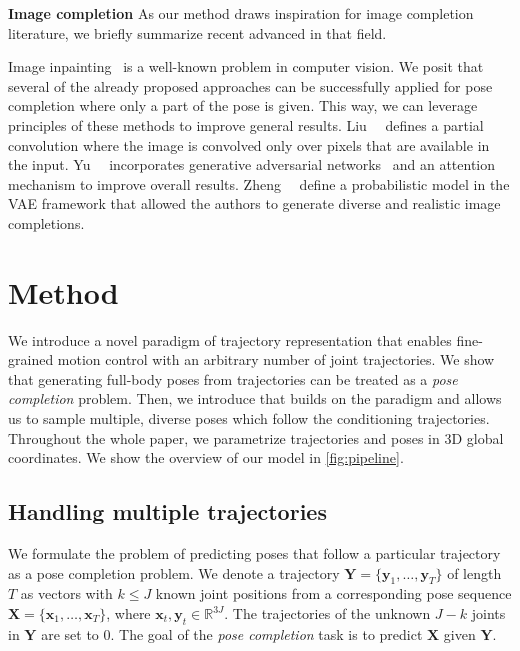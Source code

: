 \documentclass[10pt,twocolumn,letterpaper]{article}
\renewcommand{\paragraph}[1]{\noindent\textbf{#1}\enskip}
\begin{document}
\paragraph{Image completion} As our method draws inspiration for image completion literature, we briefly summarize recent advanced in that field. 

Image inpainting~\cite{bertalmio2000image} is a well-known problem in computer vision. We posit that several of the already proposed approaches \cite{liu2018image,cai2020piigan,nazeri2019edgeconnect,xiong2019foreground,yu2018generative} can be successfully applied for pose completion where only a part of the pose is given. This way, we can leverage principles of these methods to improve general results. Liu~\etal~\cite{liu2018image} defines a partial convolution where the image is convolved only over pixels that are available in the input. Yu~\etal~\cite{yu2018generative} incorporates generative adversarial networks~\cite{goodfellow2014generative} and an attention mechanism to improve overall results. Zheng~\etal~\cite{zheng2019pluralistic} define a probabilistic model in the VAE framework that allowed the authors to generate diverse and realistic image completions.

\section{Method}
We introduce a novel paradigm of trajectory representation that enables fine-grained motion control with an arbitrary number of joint trajectories. We show that generating full-body poses from trajectories can be treated as a \textit{pose completion} problem. Then, we introduce \trajevae{} that builds on the paradigm and allows us to sample multiple, diverse poses which follow the conditioning trajectories. Throughout the whole paper, we parametrize trajectories and poses in 3D global coordinates. 
We show the overview of our model in \cref{fig:pipeline}.


\subsection{Handling multiple trajectories} We formulate the problem of predicting poses that follow a particular trajectory as a pose completion problem.  We denote a trajectory $\mathbf{Y}=\{\mathbf{y}_1, \dots, \mathbf{y}_T\}$ of length $T$ as vectors with $k \leq J$ known joint positions from a corresponding pose sequence $\mathbf{X}=\{\mathbf{x}_1, \dots, \mathbf{x}_T\}$, where $\mathbf{x}_t,\mathbf{y}_t\in\mathbb{R}^{3J}$. The trajectories of the unknown $J-k$ joints in $\mathbf{Y}$ are set to $0$.  The goal of the \textit{pose completion} task is to predict $\mathbf{X}$ given $\mathbf{Y}$. 
\end{document}
